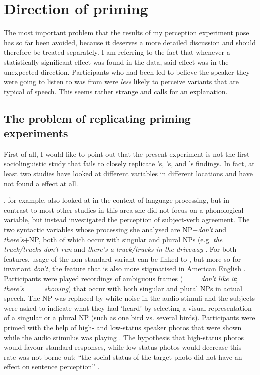 	\section{Direction of priming}
		\label{sec.perc_res.disc.direction}

The most important problem that the results of my perception experiment pose has so far been avoided, because it deserves a more detailed discussion and should therefore be treated separately.
I am referring to the fact that whenever a statistically significant  effect was found in the data, said effect was in the unexpected direction.
Participants who had been led to believe the speaker they were going to listen to was from  were \emph{less} likely to perceive variants that are typical of  speech.
This seems rather strange and calls for an explanation.

		\subsection{The problem of replicating priming experiments}

First of all, I would like to point out that the present experiment is not the first sociolinguistic study that fails to closely replicate \citeauthor{niedzielski1999}'s, \citeauthor{hayetal2006a}'s, and \citeauthor{haydrager2010}'s findings.
In fact, at least two studies have looked at different variables in different locations and have not found a  effect at all.

\citeauthor{squires2013}, for example, also looked at  in the context of language processing, but in contrast to most other studies in this area she did not focus on a phonological variable, but instead investigated the perception of subject-verb agreement.
The two syntactic variables whose processing she analysed are NP+\emph{don't} and \emph{there's}+NP, both of which occur with singular and plural NPs (e.g. \emph{the truck/trucks don't run} and \emph{there's a truck/trucks in the driveway} \parencite[cf.][206]{squires2013}.
For both features, usage of the non-standard variant can be linked to , but more so for invariant \emph{don't}, the feature that is also more stigmatised in American English \parencite[cf.][207--208]{squires2013}.
Participants were played recordings of ambiguous frames (\emph{\_\_\_ don't like it}; \emph{there's \_\_\_ showing}) that occur with both singular and plural NPs in actual speech.
The NP was replaced by white noise in the audio stimuli and the subjects were asked to indicate what they had `heard' by selecting a visual representation of a singular or a plural NP (such as one bird vs. several birds).
Participants were primed with the help of high- and low-status speaker photos that were shown while the audio stimulus was playing \parencite[cf.][210--211]{squires2013}.
The hypothesis that high-status photos would favour standard responses, while low-status photos would decrease this rate was not borne out: ``the social status of the target photo did not have an effect on sentence perception'' \parencite[216]{squires2013}.

